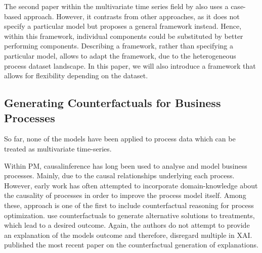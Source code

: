 \documentclass[12pt,a4paper]{report}
\begin{document}
The second paper within the multivariate time series field by \citeauthor{ates_CounterfactualExplanationsMultivariate_2021} also uses a case-based approach. However, it contrasts from other approaches, as it does not specify a particular model but proposes a general framework instead. Hence, within this framework, individual components could be substituted by better performing components. Describing a framework, rather than specifying a particular model, allows to adapt the framework, due to the heterogeneous process dataset landscape. In this paper, we will also introduce a framework that allows for flexibility depending on the dataset. 

\subsection{Generating Counterfactuals for Business Processes}
So far, none of the models have been applied to process data which can be treated as multivariate time-series.

Within \gls{PM}, \gls{causalinference} has long been used to analyse and model business processes. Mainly, due to the causal relationships underlying each process. However, early work has often attempted to incorporate domain-knowledge about the causality of processes in order to improve the process model itself\autocites{shook_AssessmentUseStructural_2004,baker_ClosingLoopEmpirical_2017,hompes_DiscoveringCausalFactors_2017,wang_CounterfactualDataAugmentedSequential_2021}.
Among these, \citeauthor{narendra_CounterfactualReasoningProcess_2019} approach is one of the first to include counterfactual reasoning for process optimization.
\citeauthor{oberst_CounterfactualOffPolicyEvaluation_2019} use counterfactuals to generate alternative solutions to treatments, which lead to a desired outcome.
Again, the authors do not attempt to provide an explanation of the models outcome and therefore, disregard multiple  in \gls{XAI}. \autocite{qafari_CaseLevelCounterfactual_2021} published the most recent paper on the counterfactual generation of explanations. 
\end{document}
